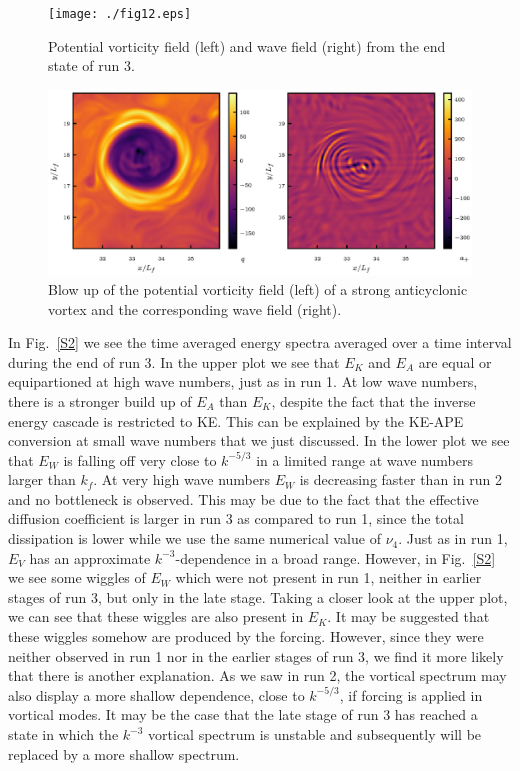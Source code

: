  \begin{figure}[h]
 \centerline{\texttt{[image: ./fig12.eps]}}
\caption{Potential vorticity field (left) and wave field (right) from the end state of run 3.}
 \label{Vis2}
 \end{figure}
 
\begin{figure}[h]
\centerline{\includegraphics[angle=0,width=18.5cm]{./fig13.eps}}
\caption{Blow up of the potential vorticity field (left) of a strong anticyclonic vortex and the corresponding wave field (right). }
\label{Vis3}
\end{figure}


 
 
In Fig.~\ref{S2} we see the time averaged energy spectra averaged over a time
interval during the end of run 3.  In the upper plot we see that $ E_K $ and $ E_A $ {
are equal or equipartioned} at high wave numbers, just as in run 1. At low wave
numbers, there is a stronger build up of $ E_A $ than $ E_K $, despite the fact that
the inverse energy cascade is restricted to KE. This can be explained by the KE-APE
conversion at small wave numbers that we just discussed.  In the lower plot we see that
$ E_W $ is falling off very close to $ k^{-5/3} $ in a limited range at wave numbers
larger than $ k_f $. At very high wave numbers  $ E_W $  is decreasing faster than in
run 2 and no bottleneck is observed. This may be due to the fact that the effective
diffusion coefficient is larger in run 3 as compared to run 1, since the total
dissipation is lower while we use the same numerical value of $ \nu_4 $.  Just as in
run 1, $ E_{V} $ has an approximate $ k^{-3} $-dependence in a broad range. However,
in Fig.~\ref{S2} we see some wiggles of $ E_W $ which were not present in run 1,
neither  in earlier stages of run 3, but only in the late stage. Taking a closer look
at the upper plot, we can see that these wiggles are also present in $ E_K $. It may be
suggested that these wiggles somehow are produced by the forcing. However, since they
were neither observed in run 1 nor in the earlier stages of run 3, we find it more
likely that there is another explanation. { As we saw in run 2, the vortical spectrum
may also display a more shallow dependence, close to $ k^{-5/3} $, if forcing is
applied in vortical modes. It may be the case that the late stage of run 3 has reached
a state in which the $ k^{-3} $ vortical spectrum is unstable and subsequently will be
replaced by a more shallow spectrum. }
 
